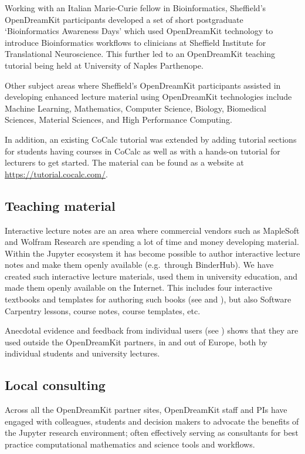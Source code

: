 \documentclass{deliverablereport}
\begin{document}
  Working with an Italian Marie-Curie fellow in Bioinformatics,
  Sheffield's OpenDreamKit participants developed a set of short
  postgraduate `Bioinformatics Awareness Days' which used OpenDreamKit
  technology to introduce Bioinformatics workflows to clinicians at
  Sheffield Institute for Translational Neuroscience. This further led
  to an OpenDreamKit teaching tutorial being held at University of
  Naples Parthenope.

  Other subject areas where Sheffield's OpenDreamKit participants
  assisted in developing enhanced lecture material using OpenDreamKit
  technologies include Machine Learning, Mathematics, Computer Science,
  Biology, Biomedical Sciences, Material Sciences, and High Performance Computing.

  In addition, an existing CoCalc tutorial was extended by
  adding tutorial sections for students having courses in CoCalc as
  well as with a hands-on tutorial for lecturers to get started. The
  material can be found as a website at
  \url{https://tutorial.cocalc.com/}.

\subsection{Teaching material}

Interactive lecture notes are an area where commercial vendors such as
MapleSoft and Wolfram Research are spending a lot of time and money
developing material. Within the Jupyter ecosystem it has become possible
to author interactive lecture notes and make them openly available
(e.g.~through BinderHub). We have created such interactive lecture
materials, used them in university education, and made them openly
available on the Internet. This includes four interactive textbooks and
templates for authoring such books (see
 and ),
but also Software Carpentry lessons, course notes, course templates,
etc.

Anecdotal evidence and feedback from individual users (see ) shows
that they are used outside the OpenDreamKit partners, in and out of
Europe, both by individual students and university lectures.

\subsection{Local consulting}

Across all the OpenDreamKit partner sites, OpenDreamKit staff and PIs
have engaged with colleagues, students and decision makers to advocate
the benefits of the Jupyter research environment; often effectively
serving as consultants for best practice computational mathematics and
science tools and workflows.
\end{document}
